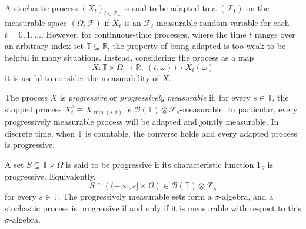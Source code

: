 \documentclass[12pt]{article}
\begin{document}
A stochastic process $(X_t)_{t\in\mathbb{Z}_+}$ is said to be adapted to a  $(\mathcal{F}_t)$ on the measurable space $(\Omega,\mathcal{F})$ if $X_t$ is an $\mathcal{F}_t$-measurable random variable for each $t=0,1,\ldots$. However, for continuous-time processes, where the time $t$ ranges over an arbitrary index set $\mathbb{T}\subseteq\mathbb{R}$, the property of being adapted is too weak to be helpful in many situations. Instead, considering the process as a map
\begin{equation*}
X\colon\mathbb{T}\times\Omega\rightarrow\mathbb{R},\ (t,\omega)\mapsto X_t(\omega)
\end{equation*}
it is useful to consider the measurability of $X$.

The process $X$ is \emph{progressive} or \emph{progressively measurable} if, for every $s\in\mathbb{T}$, the stopped process $X^s_t\equiv X_{\min(s,t)}$ is $\mathcal{B}(\mathbb{T})\otimes\mathcal{F}_s$-measurable. In particular, every progressively measurable process will be adapted and jointly measurable. In discrete time, when $\mathbb{T}$ is countable, the converse holds and every adapted process is progressive.

A set $S\subseteq\mathbb{T}\times\Omega$ is said to be progressive if its characteristic function $1_S$ is progressive. Equivalently,
\begin{equation*}
S\cap\left( (-\infty,s]\times\Omega\right)\in\mathcal{B}(\mathbb{T})\otimes\mathcal{F}_s
\end{equation*}
for every $s\in\mathbb{T}$. The progressively measurable sets form a $\sigma$-algebra, and a stochastic process is progressive if and only if it is measurable with respect to this $\sigma$-algebra.

\end{document}
